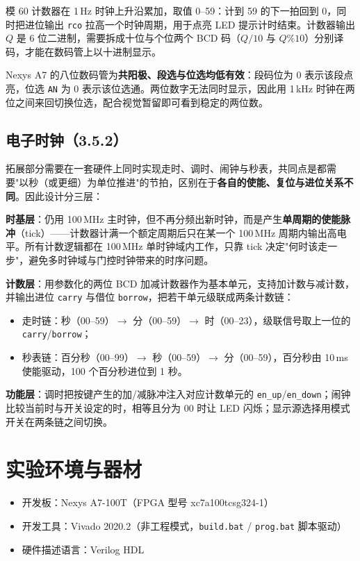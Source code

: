 \documentclass[12pt, a4paper]{ctexart}
\begin{document}
模 60 计数器在 1\,Hz 时钟上升沿累加，取值 0--59：计到 59 的下一拍回到 0，同时把进位输出 \texttt{rco} 拉高一个时钟周期，用于点亮 LED 提示计时结束。计数器输出 $Q$ 是 6 位二进制，需要拆成十位与个位两个 BCD 码（$Q/10$ 与 $Q\%10$）分别译码，才能在数码管上以十进制显示。

Nexys A7 的八位数码管为\textbf{共阳极、段选与位选均低有效}：段码位为 0 表示该段点亮，位选 \texttt{AN} 为 0 表示该位选通。两位数字无法同时显示，因此用 1\,kHz 时钟在两位之间来回切换位选，配合视觉暂留即可看到稳定的两位数。

\subsection{电子时钟（3.5.2）}
拓展部分需要在一套硬件上同时实现走时、调时、闹钟与秒表，共同点是都需要"以秒（或更细）为单位推进"的节拍，区别在于\textbf{各自的使能、复位与进位关系不同}。因此设计分三层：

\textbf{时基层}：仍用 100\,MHz 主时钟，但不再分频出新时钟，而是产生\textbf{单周期的使能脉冲}（tick）——计数器计满一个额定周期后只在某一个 100\,MHz 周期内输出高电平。所有计数逻辑都在 100\,MHz 单时钟域内工作，只靠 tick 决定"何时该走一步"，避免多时钟域与门控时钟带来的时序问题。

\textbf{计数层}：用参数化的两位 BCD 加减计数器作为基本单元，支持加计数与减计数，并输出进位 \texttt{carry} 与借位 \texttt{borrow}，把若干单元级联成两条计数链：
\begin{itemize}
    \item 走时链：秒（00--59）$\to$ 分（00--59）$\to$ 时（00--23），级联信号取上一位的 \texttt{carry}/\texttt{borrow}；
    \item 秒表链：百分秒（00--99）$\to$ 秒（00--59）$\to$ 分（00--59），百分秒由 10\,ms 使能驱动，100 个百分秒进位到 1 秒。
\end{itemize}
\textbf{功能层}：调时把按键产生的加/减脉冲注入对应计数单元的 \texttt{en\_up}/\texttt{en\_down}；闹钟比较当前时与开关设定的时，相等且分为 00 时让 LED 闪烁；显示源选择用模式开关在两条链之间切换。

\section{实验环境与器材}
\begin{itemize}
    \item 开发板：Nexys A7-100T（FPGA 型号 xc7a100tcsg324-1）
    \item 开发工具：Vivado 2020.2（非工程模式，\texttt{build.bat} / \texttt{prog.bat} 脚本驱动）
    \item 硬件描述语言：Verilog HDL
\end{itemize}
\end{document}
